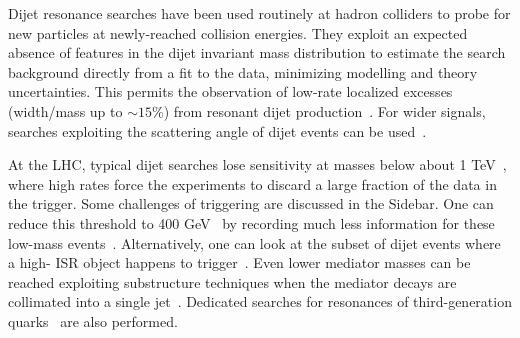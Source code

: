 Dijet resonance searches have been used routinely at hadron colliders to probe for new particles at newly-reached collision energies.%
They exploit an expected absence of features in the dijet invariant mass distribution to estimate the search background directly from a fit to the data, minimizing modelling and theory uncertainties.
This permits the observation of low-rate localized excesses (width/mass up to $\sim15$\%) from resonant dijet production~\cite{Aaboud:2017yvp,CMS-PAS-EXO-16-056}.
For wider signals, searches exploiting the scattering angle of dijet events can be used~\cite{CMS-PAS-EXO-16-046,Aaboud:2017yvp}. 



At the LHC, typical dijet searches lose sensitivity at masses below about 1 TeV~\cite{An:2012ue,Dobrescu:2013coa}, where high rates force the experiments to discard a large fraction of the data in the trigger.
Some challenges of triggering are discussed in the Sidebar. 
One can reduce this threshold to 400 GeV~\cite{CMS-PAS-EXO-16-056,ATLAS:2016xiv} by recording much less information for these low-mass events~\cite{Aaij:2016rxn,CMS-PAS-EXO-16-056,Aaboud:2016leb}.
Alternatively, one can look at the subset of dijet events where a high-\pt{} ISR object happens to trigger~\cite{ATLAS:2016bvn,Sirunyan:2017nvi}. %
Even lower mediator masses can be reached exploiting substructure techniques when the mediator decays are collimated into a single jet~\cite{Sirunyan:2017nvi,Aaboud:2018zba}.
Dedicated searches for resonances of third-generation quarks~\cite{lowMassDiB,CMS-PAS-HIG-16-025,Aaboud:2017hnm} are also performed.

